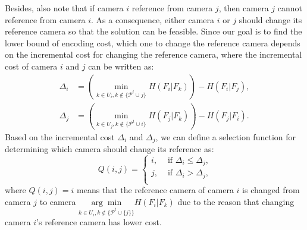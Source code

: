 Besides, also note that if camera $i$ reference from camera $j$, then camera $j$ cannot reference from camera $i$.
As a consequence, either camera $i$ or $j$ should change its reference camera so that the solution can be feasible.
Since our goal is to find the lower bound of encoding cost, which one to change the reference camera depends on the incremental cost for changing the reference camera, where the incremental cost of camera $i$ and $j$ can be written as:
\begin{align}
\Delta_i &= \left( \underset{k \in U_i, k \notin \{\mathcal{P}^t \cup j\}}{\min} H(F_i|F_k) \right) - H(F_i|F_j), \nonumber \\
\Delta_j &= \left( \underset{k \in U_j, k \notin \{\mathcal{P}^t \cup i\}}{\min} H(F_j|F_k) \right) - H(F_j|F_i).
\end{align}
Based on the incremental cost $\Delta_i$ and $\Delta_j$, we can define a selection function for determining which camera should change its reference as:
\begin{equation}
Q(i,j) = 
\left\{ \begin{array}{ll}
i,  &\text{ if $\Delta_i \leq \Delta_j$,} \\                  	   
j,  &\text{ if $\Delta_i > \Delta_j$,} \\
\end{array} \right.
\label{eq::selectionFunctionQ}
\end{equation}
where $Q(i,j) = i$ means that the reference camera of camera $i$ is changed from camera $j$ to camera $\underset{k \in U_i, k \notin \{\mathcal{P}^t \cup\{j\}\}}{\arg \min} H(F_i|F_k)$ due to the reason that changing camera $i$'s reference camera has lower cost.

